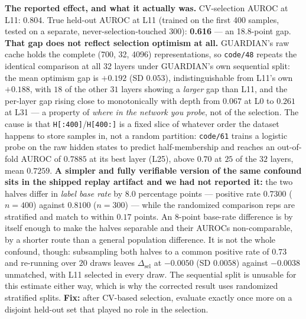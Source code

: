 \documentclass[10pt]{article} %
\begin{document}
\textbf{The reported effect, and what it actually was.} CV-selection AUROC at
L11: 0.804. True held-out AUROC at L11 (trained on the first 400 samples,
tested on a separate, never-selection-touched 300): \textbf{0.616} --- an
18.8-point gap. \textbf{That gap does not reflect selection optimism at all.}
GUARDIAN's raw cache holds the complete (700, 32, 4096) representations, so
\texttt{code/48} repeats the identical comparison at all 32 layers under
GUARDIAN's own sequential split: the mean optimism gap is $+0.192$ (SD
$0.053$), indistinguishable from L11's own $+0.188$, with $18$ of the other
$31$ layers showing a \emph{larger} gap than L11, and the per-layer gap rising
close to monotonically with depth from $0.067$ at L0 to $0.261$ at L31 --- a
property of \emph{where in the network you probe}, not of the selection. The
cause is that \texttt{H[:400]}/\texttt{H[400:]} is a fixed slice of whatever
order the dataset happens to store samples in, not a random partition:
\texttt{code/61} trains a logistic probe on the raw hidden states to predict
half-membership and reaches an out-of-fold AUROC of $0.7885$ at its best layer
(L25), above $0.70$ at $25$ of the $32$ layers, mean $0.7259$. \textbf{A
simpler and fully verifiable version of the same confound sits in the shipped
replay artifact and we had not reported it:} the two halves differ in
\emph{label base rate} by $8.0$ percentage points --- positive rate $0.7300$
($n=400$) against $0.8100$ ($n=300$) --- while the randomized comparison reps
are stratified and match to within $0.17$ points. An $8$-point base-rate
difference is by itself enough to make the halves separable and their AUROCs
non-comparable, by a shorter route than a general population difference. It is
not the whole confound, though: subsampling both halves to a common positive
rate of $0.73$ and re-running over $20$ draws leaves $\Delta_{\text{sel}}$ at
$-0.0050$ (SD $0.0058$) against $-0.0038$ unmatched, with L11 selected in every
draw. The sequential split is unusable for this estimate either way, which is
why the corrected result uses randomized stratified splits. \textbf{Fix:} after
CV-based selection, evaluate exactly once more on a disjoint held-out set that
played no role in the selection.
\end{document}
